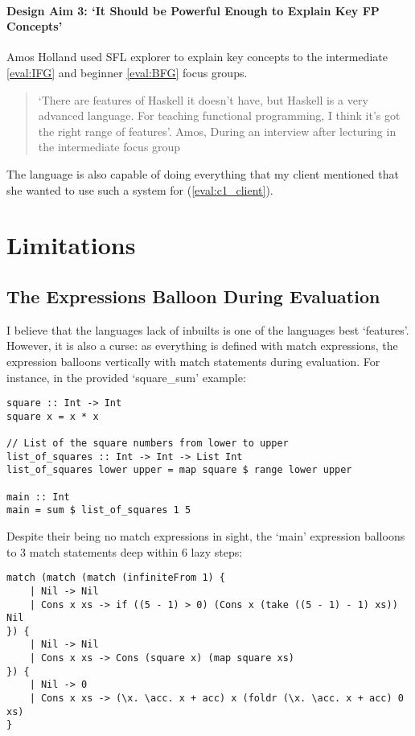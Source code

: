 \paragraph{Design Aim 3: `It Should be Powerful Enough to Explain Key \ac{FP} Concepts'}
Amos Holland used SFL explorer to explain key concepts to the intermediate \ref{eval:IFG} and beginner \ref{eval:BFG} focus groups. 

\begin{quotation}
\noindent `There are features of Haskell it doesn't have, but Haskell is a very advanced language. For teaching functional programming, I think it's got the right range of features'. Amos, During an interview after lecturing in the intermediate focus group
\end{quotation}

\noindent The language is also capable of doing everything that my client mentioned that she wanted to use such a system for (\ref{eval:c1_client}).


\section{Limitations}
\subsection{The Expressions Balloon During Evaluation}
I believe that the languages lack of inbuilts is one of the languages best `features'. However, it is also a curse: as everything is defined with match expressions, the expression balloons vertically with match statements during evaluation. For instance, in the provided `square\_sum' example:

\begin{lstlisting}[language=SFL]
square :: Int -> Int
square x = x * x

// List of the square numbers from lower to upper
list_of_squares :: Int -> Int -> List Int
list_of_squares lower upper = map square $ range lower upper

main :: Int
main = sum $ list_of_squares 1 5
\end{lstlisting}

Despite their being no match expressions in sight, the `main' expression balloons to 3 match statements deep within 6 lazy steps:

\begin{lstlisting}[language=SFL]
match (match (match (infiniteFrom 1) {
    | Nil -> Nil
    | Cons x xs -> if ((5 - 1) > 0) (Cons x (take ((5 - 1) - 1) xs)) Nil
}) {
    | Nil -> Nil
    | Cons x xs -> Cons (square x) (map square xs)
}) {
    | Nil -> 0
    | Cons x xs -> (\x. \acc. x + acc) x (foldr (\x. \acc. x + acc) 0 xs)
}
\end{lstlisting}

